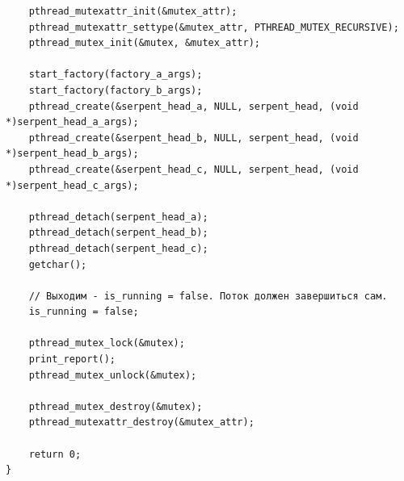 \documentclass[a4paper,14pt]{extarticle}
\begin{document}
\begin{verbatim}
    pthread_mutexattr_init(&mutex_attr);
    pthread_mutexattr_settype(&mutex_attr, PTHREAD_MUTEX_RECURSIVE);
    pthread_mutex_init(&mutex, &mutex_attr);

    start_factory(factory_a_args);
    start_factory(factory_b_args);
    pthread_create(&serpent_head_a, NULL, serpent_head, (void *)serpent_head_a_args);
    pthread_create(&serpent_head_b, NULL, serpent_head, (void *)serpent_head_b_args);
    pthread_create(&serpent_head_c, NULL, serpent_head, (void *)serpent_head_c_args);

    pthread_detach(serpent_head_a);
    pthread_detach(serpent_head_b);
    pthread_detach(serpent_head_c);
    getchar();

    // Выходим - is_running = false. Поток должен завершиться сам.
    is_running = false;

    pthread_mutex_lock(&mutex);
    print_report();
    pthread_mutex_unlock(&mutex);

    pthread_mutex_destroy(&mutex);
    pthread_mutexattr_destroy(&mutex_attr);

    return 0;
}
\end{verbatim}
\end{document}
